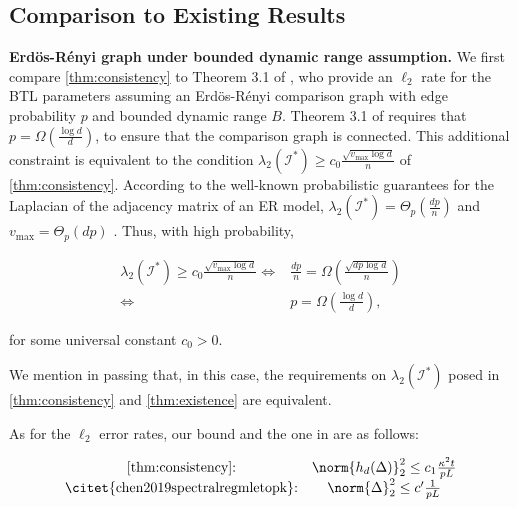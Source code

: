 \subsection{Comparison to Existing Results} \label{sec:vs_chen_shah}

 {\bf Erd\"os-R\'enyi graph under bounded dynamic range assumption.} We first compare \ref{thm:consistency} to Theorem 3.1 of \citet{chen2019spectralregmletopk}, who provide an $\ell_2$ rate for the BTL parameters assuming an Erd\"os-R\'enyi comparison graph with edge probability $p$ and bounded dynamic range $B$. Theorem 3.1 of \citet{chen2019spectralregmletopk} requires that $p = \Omega(\frac{\log d}{d})$, to ensure that the comparison graph is connected. This additional constraint is equivalent to the condition $\lambda_2(\mathcal{I}^*) \geq c_0 \frac{\sqrt{ v_{\max} \log d}}{n}$  of \ref{thm:consistency}. According to the well-known probabilistic guarantees for the Laplacian of the adjacency matrix of an ER model, $\lambda_2(\mathcal{I}^*) = \Theta_p(\frac{dp}{n})$ and $v_\mathrm{max}=\Theta_p(dp)$ \citep[see, e.g.,][]{MAL-048}. Thus, with high probability,

\begin{equation}
\begin{split}
    \lambda_2(\mathcal{I}^*) \geq c_0 \frac{\sqrt{v_{\max} \log d}}{n} 
    \Leftrightarrow & \frac{dp}{n} = \Omega\left(\frac{\sqrt{dp \log d}}{n}\right) \\
    \Leftrightarrow & p = \Omega\left(\frac{\log d}{d}\right),
\end{split}
\end{equation}

for some universal constant $c_0 > 0$.

We mention in passing that, in this case, the requirements on $\lambda_2(\mathcal{I}^*)$ posed in \ref{thm:consistency} and \ref{thm:existence} are equivalent.

As for the $\ell_2$ error rates, our bound and the one in \citet{chen2019spectralregmletopk} are as follows:

\begin{equation} \label{eq:vs_chen}
\begin{array}{cc}
    \text{\ref{thm:consistency}:} &  \norm{h_d(\Delta)}_2^2 \leq c_1 \frac{\kappa^2t}{pL}\\
    \text{\citet{chen2019spectralregmletopk}:} & \norm{\Delta}_2^2 \leq c' \frac{1}{pL}
\end{array}
\end{equation}

